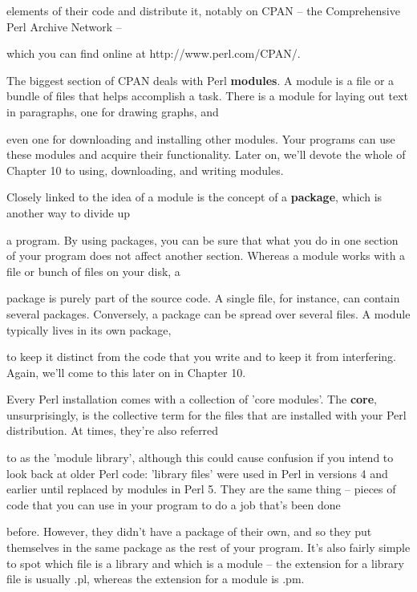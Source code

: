 \documentclass[a4paper,11pt]{book}
\begin{document}
\noindent elements of their code and distribute it, notably on CPAN -- the Comprehensive Perl Archive Network --

\noindent which you can find online at http://www.perl.com/CPAN/.

\noindent 

\noindent The biggest section of CPAN deals with Perl \textbf{modules}. A module is a file or a bundle of files that helps accomplish a task. There is a module for laying out text in paragraphs, one for drawing graphs, and

\noindent even one for downloading and installing other modules. Your programs can use these modules and acquire their functionality. Later on, we'll devote the whole of Chapter 10 to using, downloading, and writing modules.

\noindent 

\noindent 

\noindent Closely  linked to  the idea of a  module  is  the  concept  of  a  \textbf{package},  which  is  another  way to  divide  up

\noindent a  program.  By using packages,  you  can  be  sure  that  what  you  do  in  one section  of  your program  does not affect another section.  Whereas  a  module  works  with  a  file  or  bunch  of  files  on  your disk,  a

\noindent package is purely part of the source  code.  A  single  file,  for  instance,  can  contain  several  packages. Conversely,  a package  can be  spread  over  several  files.  A  module  typically  lives  in  its  own  package,

\noindent to  keep  it  distinct from the code  that  you  write  and  to  keep  it  from  interfering.  Again,  we'll  come to this  later on in  Chapter 10.

\noindent 

\noindent Every Perl installation comes with a collection of 'core modules'. The \textbf{core}, unsurprisingly, is the collective term for the files that are installed with your Perl distribution. At times, they're also referred

\noindent to as the 'module library', although this could cause confusion if you intend to look back at older Perl code: 'library files' were used in Perl in versions 4 and earlier until replaced by modules in Perl 5. They are the same thing -- pieces of code that you can use in your program to do a job that's been done

\noindent before. However, they didn't have a package of their own, and so they put themselves in the same package as the rest of your program. It's also fairly simple to spot which file is a library and which is a module -- the extension for a library file is usually .pl, whereas the extension for a module is .pm.
\end{document}
